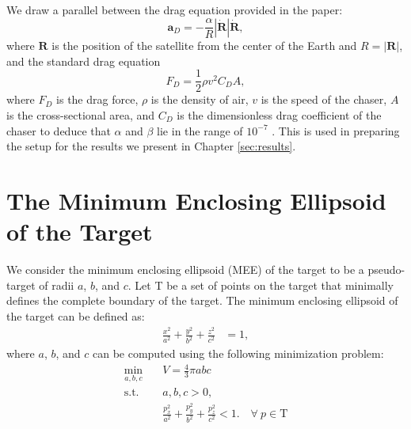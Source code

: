 We draw a parallel between the drag equation provided in the paper:
\begin{equation}
    \boldsymbol{a}_{D}=-\frac{\alpha}{R}|\dot{\boldsymbol{R}}|\dot{\boldsymbol{R}},
\end{equation}
where $\boldsymbol{R}$ is the position of the satellite from the center of the Earth and $R=|\boldsymbol{R}|$, and the standard drag equation \cite{batchelor2000an}
\begin{equation}
    F_{D}=\frac{1}{2}\rho v^{2}C_{D}A,
\end{equation}
where $F_{D}$ is the drag force, $\rho$ is the density of air, $v$ is the speed of the chaser, $A$ is the cross-sectional area, and $C_{D}$ is the dimensionless drag coefficient of the chaser to deduce that $\alpha$ and $\beta$ lie in the range of $10^{-7}$ \cite{li2011perturbation}.
This is used in preparing the setup for the results we present in Chapter \ref{sec:results}.

\chapter{The Minimum Enclosing Ellipsoid of the Target}
\label{app:mee}
We consider the minimum enclosing ellipsoid (MEE) \cite{kallberg2019minimum} of the target to be a pseudo-target of radii $a$, $b$, and $c$.
Let T be a set of points on the target that minimally defines the complete boundary of the target.
The minimum enclosing ellipsoid of the target can be defined as:
\begin{align}
    \frac{x^2}{a^2}+\frac{y^2}{b^2}+\frac{z^2}{c^2}&=1,
\end{align}
where $a$, $b$, and $c$ can be computed using the following minimization problem:
\begin{equation}
\begin{aligned}
    \min_{a, b, c}\quad &V=\frac{4}{3}\pi abc\\
    \textrm{s.t. } & a,b,c>0,\\
    & \frac{p_x^2}{a^2}+\frac{p_y^2}{b^2}+\frac{p_z^2}{c^2}<1.\quad\forall\ p\in \text{T}
    \label{eqn:mee}
\end{aligned}
\end{equation}

